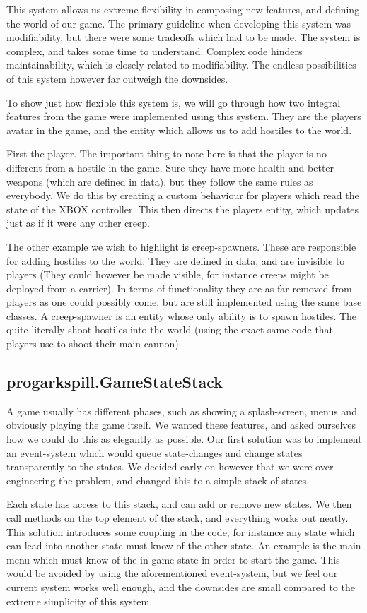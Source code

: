 This system allows us extreme flexibility in composing new features, and 
defining the world of our game. The primary guideline when developing this
system was modifiability, but there were some tradeoffs which had to be made.
The system is complex, and takes some time to understand. Complex code hinders
maintainability, which is closely related to modifiability. The endless 
possibilities of this system however far outweigh the downsides.

To show just how flexible this system is, we will go through how two integral
features from the game were implemented using this system. They are the players
avatar in the game, and the entity which allows us to add hostiles to the 
world.

First the player. The important thing to note here is that the player is no
different from a hostile in the game. Sure they have more health and better
weapons (which are defined in data), but they follow the same rules as 
everybody. We do this by creating a custom behaviour for players which read the
state of the XBOX controller. This then directs the players entity, which
updates just as if it were any other creep.

The other example we wish to highlight is creep-spawners. These are responsible
for adding hostiles to the world. They are defined in data, and are invisible
to players (They could however be made visible, for instance creeps might be
deployed from a carrier). In terms of functionality they are as far removed 
from players as one could possibly come, but are still implemented using the
same base classes.  A creep-spawner is an entity whose only ability is to spawn
hostiles. The quite literally shoot hostiles into the world (using the exact
same code that players use to shoot their main cannon)

\subsection{progarkspill.GameStateStack}
A game usually has different phases, such as showing a splash-screen, menus and
obviously playing the game itself. We wanted these features, and asked 
ourselves how we could do this as elegantly as possible.  Our first solution
was to implement an event-system which would queue state-changes and change
states transparently to the states. We decided early on however that we were
over-engineering the problem, and changed this to a simple stack of states.

Each state has access to this stack, and can add or remove new states. We then
call methods on the top element of the stack, and everything works out neatly.
This solution introduces some coupling in the code, for instance any state 
which can lead into another state must know of the other state. An example is
the main menu which must know of the in-game state in order to start the game.
This would be avoided by using the aforementioned event-system, but we feel
our current system works well enough, and the downsides are small compared to
the extreme simplicity of this system.

